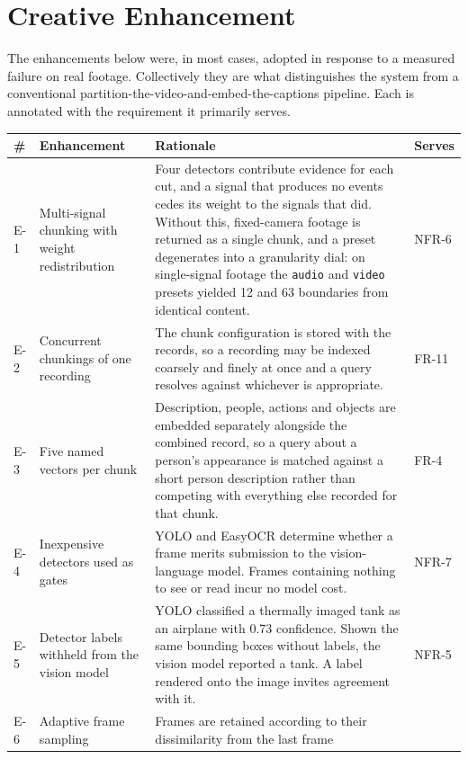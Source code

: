 \documentclass[11pt,a4paper]{article}
\begin{document}
\section{Creative Enhancement}

The enhancements below were, in most cases, adopted in response to a measured
failure on real footage. Collectively they are what distinguishes the system
from a conventional partition-the-video-and-embed-the-captions pipeline. Each is
annotated with the requirement it primarily serves.

\begin{table}[htbp]
\centering
\small
\begin{tabularx}{\textwidth}{@{}lL{3.2cm}XL{1.2cm}@{}}
\toprule
\textbf{\#} & \textbf{Enhancement} & \textbf{Rationale} & \textbf{Serves} \\
\midrule
E-1 & Multi-signal chunking with weight redistribution &
Four detectors contribute evidence for each cut, and a signal that produces no
events cedes its weight to the signals that did. Without this, fixed-camera
footage is returned as a single chunk, and a preset degenerates into a
granularity dial: on single-signal footage the \texttt{audio} and \texttt{video}
presets yielded 12 and 63 boundaries from identical content. & NFR-6 \\
E-2 & Concurrent chunkings of one recording &
The chunk configuration is stored with the records, so a recording may be
indexed coarsely and finely at once and a query resolves against whichever is
appropriate. & FR-11 \\
E-3 & Five named vectors per chunk &
Description, people, actions and objects are embedded separately alongside the
combined record, so a query about a person's appearance is matched against a
short person description rather than competing with everything else recorded for
that chunk. & FR-4 \\
E-4 & Inexpensive detectors used as gates &
YOLO and EasyOCR determine whether a frame merits submission to the
vision-language model. Frames containing nothing to see or read incur no model
cost. & NFR-7 \\
E-5 & Detector labels withheld from the vision model &
YOLO classified a thermally imaged tank as an airplane with 0.73 confidence.
Shown the same bounding boxes without labels, the vision model reported a tank.
A label rendered onto the image invites agreement with it. & NFR-5 \\
E-6 & Adaptive frame sampling &
Frames are retained according to their dissimilarity from the last frame

\end{tabularx}
\end{table}
\end{document}
